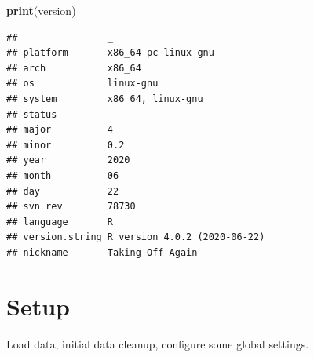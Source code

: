 \documentclass[
]{book}
\newenvironment{Shaded}{\begin{snugshade}}{\end{snugshade}}
\newcommand{\KeywordTok}[1]{\textcolor[rgb]{0.13,0.29,0.53}{\textbf{#1}}}
\newcommand{\NormalTok}[1]{#1}
\begin{document}
\begin{Shaded}
\begin{Highlighting}[]
\KeywordTok{print}\NormalTok{(version)}
\end{Highlighting}
\end{Shaded}

\begin{verbatim}
##                _                           
## platform       x86_64-pc-linux-gnu         
## arch           x86_64                      
## os             linux-gnu                   
## system         x86_64, linux-gnu           
## status                                     
## major          4                           
## minor          0.2                         
## year           2020                        
## month          06                          
## day            22                          
## svn rev        78730                       
## language       R                           
## version.string R version 4.0.2 (2020-06-22)
## nickname       Taking Off Again
\end{verbatim}

\hypertarget{setup-4}{%
\section{Setup}\label{setup-4}}

Load data, initial data cleanup, configure some global settings.
\end{document}
